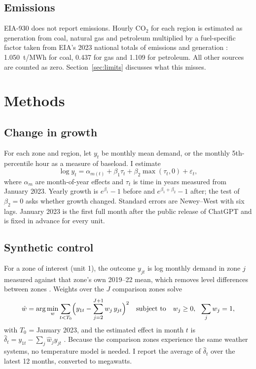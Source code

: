 \documentclass[11pt,a4paper]{article}
\begin{document}
\subsection{Emissions}
EIA-930 does not report emissions. Hourly CO$_2$ for each region is estimated as generation from coal, natural gas and petroleum multiplied by a fuel-specific factor taken from EIA's 2023 national totals of emissions and generation \cite{eiafaq}: 1.050~t/MWh for coal, 0.437 for gas and 1.109 for petroleum. All other sources are counted as zero. Section~\ref{sec:limits} discusses what this misses.

\section{Methods}

\subsection{Change in growth}\label{sec:m-growth}
For each zone and region, let $y_t$ be monthly mean demand, or the monthly 5th-percentile hour as a measure of baseload. I estimate
\begin{equation}
\log y_t = \alpha_{m(t)} + \beta_1 \tau_t + \beta_2 \max(\tau_t, 0) + \varepsilon_t ,
\label{eq:growth}
\end{equation}
where $\alpha_m$ are month-of-year effects and $\tau_t$ is time in years measured from January 2023. Yearly growth is $e^{\beta_1}-1$ before and $e^{\beta_1+\beta_2}-1$ after; the test of $\beta_2 = 0$ asks whether growth changed. Standard errors are Newey--West \cite{neweywest} with six lags. January 2023 is the first full month after the public release of ChatGPT and is fixed in advance for every unit.

\subsection{Synthetic control}\label{sec:m-scm}
For a zone of interest (unit 1), the outcome $y_{jt}$ is log monthly demand in zone $j$ measured against that zone's own 2019--22 mean, which removes level differences between zones \cite{doudchenko}. Weights over the $J$ comparison zones solve
\begin{equation}
\hat{w} = \arg\min_{w} \sum_{t < T_0} \Bigl( y_{1t} - \sum_{j=2}^{J+1} w_j\, y_{jt} \Bigr)^{2}
\quad \text{subject to} \quad w_j \ge 0,\ \ \sum_j w_j = 1 ,
\label{eq:scm}
\end{equation}
with $T_0$ = January 2023, and the estimated effect in month $t$ is $\hat{\delta}_t = y_{1t} - \sum_j \hat{w}_j y_{jt}$ \cite{adh2010,abadie2021}. Because the comparison zones experience the same weather systems, no temperature model is needed. I report the average of $\hat\delta_t$ over the latest 12 months, converted to megawatts.
\end{document}
